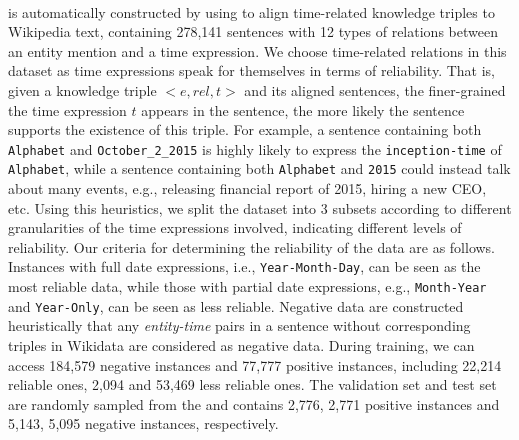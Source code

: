 \paragraph{\TimeRE}
 is automatically constructed by using \DS to align time-related  knowledge triples to
Wikipedia text, containing 278,141 sentences with 12
types of relations  between an entity mention and a time expression.
We choose time-related relations in this dataset as time expressions speak for themselves in
terms of reliability. That is, given a knowledge triple $<$$e,rel,t$$>$ and its
aligned sentences,  the  finer-grained the time expression $t$ appears in the sentence,
the more likely the sentence  supports the existence of this triple.
For example, a sentence containing both \texttt{Alphabet} and \texttt{October\_2\_2015} is highly likely to express the \texttt{inception-time} of \texttt{Alphabet}, while a sentence containing both \texttt{Alphabet} and \texttt{2015} could instead talk  about many events, e.g.,  releasing financial report of 2015, hiring a new CEO, etc.
Using this heuristics, we split the dataset into
3 subsets according to different granularities of the time expressions involved, indicating different levels of reliability.
Our criteria for determining the reliability of the data are as follows.
Instances with full date expressions, i.e., \texttt{Year-Month-Day}, can be seen as the most reliable data, while those with
partial date expressions, e.g., \texttt{Month-Year} and \texttt{Year-Only}, can be seen as less
reliable.  Negative data are constructed  heuristically that any
\emph{entity-time} pairs in a sentence without corresponding triples in Wikidata are considered as negative data. 
During training, we can access  184,579 negative
instances and  77,777 positive instances, including 22,214 reliable
ones, 2,094 and 53,469 less reliable ones. The validation set and test set are randomly sampled from 
the   and contains
2,776, 2,771 positive instances and 5,143, 5,095 negative instances, respectively. 


